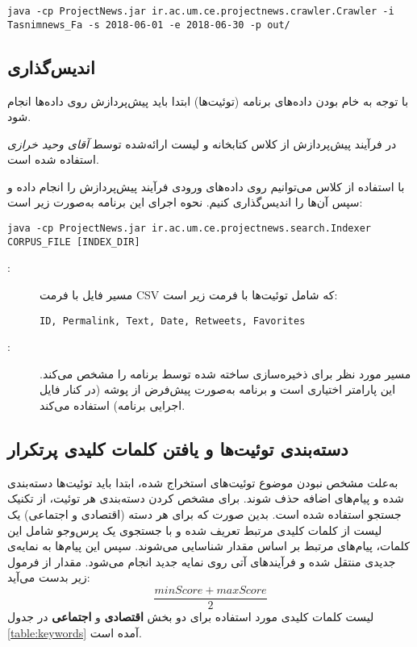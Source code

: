 \documentclass[a4paper, 12pt]{article}
\newcommand\code[1]{\lr{\ttfamily\fontseries{b}\selectfont{#1}}}
\begin{document}
\begin{latin}
    \begin{lstlisting}
java -cp ProjectNews.jar ir.ac.um.ce.projectnews.crawler.Crawler -i Tasnimnews_Fa -s 2018-06-01 -e 2018-06-30 -p out/
    \end{lstlisting}
\end{latin}

\subsection{اندیس‌گذاری}
با توجه به خام بودن داده‌های برنامه (توئیت‌ها) ابتدا باید پیش‌پردازش روی داده‌ها انجام شود.

در فرآیند پیش‌پردازش از کلاس \code{PersianAnalyzer} کتابخانه  و لیست  ارائه‌شده توسط \textit{آقای وحید خرازی}
استفاده شده است.

با استفاده از کلاس \code{Indexer} می‌توانیم روی داده‌های ورودی فرآیند پیش‌پردازش را انجام داده و سپس آن‌ها را اندیس‌گذاری کنیم. نحوه اجرای این برنامه به‌صورت زیر است:

\begin{latin}
    \begin{lstlisting}
java -cp ProjectNews.jar ir.ac.um.ce.projectnews.search.Indexer CORPUS_FILE [INDEX_DIR]
    \end{lstlisting}
\end{latin}

\begin{description}
\item[\code{CORPUS\_FILE}:]
مسیر فایل  با فرمت CSV که شامل توئیت‌ها با فرمت زیر است:
\begin{latin}
    \begin{lstlisting}
ID, Permalink, Text, Date, Retweets, Favorites
    \end{lstlisting}
\end{latin}
\item[\code{INDEX\_DIR}:]
مسیر مورد نظر برای ذخیره‌سازی  ساخته شده توسط برنامه را مشخص می‌کند. این پارامتر اختیاری است و برنامه به‌صورت پیش‌فرض از پوشه  (در کنار فایل اجرایی برنامه) استفاده می‌کند.
\end{description}

\subsection{دسته‌بندی توئیت‌ها و یافتن کلمات کلیدی پرتکرار}
به‌علت مشخص نبودن موضوع توئیت‌های استخراج شده، ابتدا باید توئیت‌ها دسته‌بندی شده و پیام‌های اضافه حذف شوند. برای مشخص کردن دسته‌بندی هر توئیت، از تکنیک جستجو استفاده شده است. بدین صورت که برای هر دسته (اقتصادی و اجتماعی) یک لیست از کلمات کلیدی مرتبط تعریف شده و با جستجوی یک پرس‌وجو شامل این کلمات، پیام‌های مرتبط بر اساس مقدار  شناسایی می‌شوند. سپس این پیام‌ها به نمایه‌ی جدیدی منتقل شده و فرآیندهای آتی روی نمایه جدید انجام می‌شود. مقدار  از فرمول زیر بدست می‌آید:
\[ \frac{minScore + maxScore}{2} \]
لیست کلمات کلیدی مورد استفاده برای دو بخش \textbf{اقتصادی} و \textbf{اجتماعی} در جدول \ref{table:keywords} آمده است.
\end{document}
